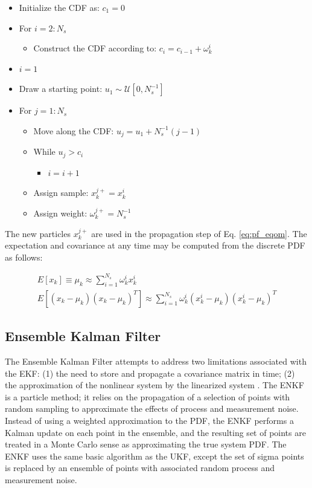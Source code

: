 \documentclass[]{article}
\begin{document}
\begin{itemize}
\item Initialize the CDF as: $c_1 = 0$
\item For $i = 2:N_s$
	\begin{itemize}
	\item Construct the CDF according to: $c_i = c_{i-1} + \omega_k^i$
	\end{itemize}
\item $i = 1$
\item Draw a starting point: $u_1 \sim \mathcal{U}[0,N_s^{-1}]$
\item For $j = 1:N_s$
\begin{itemize}
	\item Move along the CDF: $u_j = u_1 + N_s^{-1}(j-1)$
	\item While $u_j > c_i$
		\begin{itemize}
		\item $i = i+1$
		\end{itemize}
	\item Assign sample: $x_k^{j+} = x_k^i$
	\item Assign weight: $\omega_k^{j+} = N_s^{-1}$
\end{itemize}
\end{itemize}

The new particles $x_k^{j+}$ are used in the propagation step of Eq. \ref{eq:pf_eqom}. The expectation and covariance at any time may be computed from the discrete PDF as follows:

\begin{align}
E[x_k] \equiv \mu_k \approx \sum_{i=1}^{N_s} \omega^{i}_k x^{i}_k \\
E[(x_k-\mu_k)(x_k-\mu_k)^T] \approx \sum_{i=1}^{N_s} \omega^{i}_k (x^i_k - \mu_k)(x^i_k - \mu_k)^T
\end{align}

\subsection{Ensemble Kalman Filter}

The Ensemble Kalman Filter attempts to address two limitations associated with the EKF: (1) the need to store and propagate a covariance matrix in time; (2) the approximation of the nonlinear system by the linearized system \cite{evensen}. The ENKF is a particle method; it relies on the propagation of a selection of points with random sampling to approximate the effects of process and measurement noise. Instead of using a weighted approximation to the PDF, the ENKF performs a Kalman update on each point in the ensemble, and the resulting set of points are treated in a Monte Carlo sense as approximating the true system PDF. The ENKF uses the same basic algorithm as the UKF, except the set of sigma points is replaced by an ensemble of points with associated random process and measurement noise.
\end{document}
